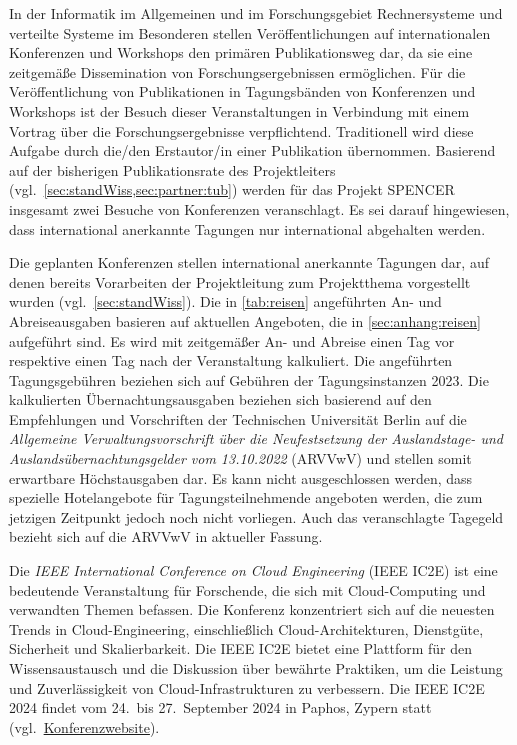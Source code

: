 In der Informatik im Allgemeinen und im Forschungsgebiet Rechnersysteme und verteilte Systeme im Besonderen stellen Veröffentlichungen auf internationalen Konferenzen und Workshops den primären Publikationsweg dar, da sie eine zeitgemäße Dissemination von Forschungsergebnissen ermöglichen.
Für die Veröffentlichung von Publikationen in Tagungsbänden von Konferenzen und Workshops ist der Besuch dieser Veranstaltungen in Verbindung mit einem Vortrag über die Forschungsergebnisse verpflichtend.
Traditionell wird diese Aufgabe durch die/den Erstautor/in einer Publikation übernommen.
Basierend auf der bisherigen Publikationsrate des Projektleiters (vgl.~\cref{sec:standWiss,sec:partner:tub}) werden für das Projekt SPENCER insgesamt zwei Besuche von Konferenzen veranschlagt.
Es sei darauf hingewiesen, dass international anerkannte Tagungen nur international abgehalten werden.

Die geplanten Konferenzen stellen international anerkannte Tagungen dar, auf denen bereits Vorarbeiten der Projektleitung zum Projektthema vorgestellt wurden (vgl.~\cref{sec:standWiss}).
Die in \cref{tab:reisen} angeführten An- und Abreiseausgaben basieren auf aktuellen Angeboten, die in \cref{sec:anhang:reisen} aufgeführt sind.
Es wird mit zeitgemäßer An- und Abreise einen Tag vor respektive einen Tag nach der Veranstaltung kalkuliert.
Die angeführten Tagungsgebühren beziehen sich auf Gebühren der Tagungsinstanzen 2023.
Die kalkulierten Übernachtungsausgaben beziehen sich basierend auf den Empfehlungen und Vorschriften der Technischen Universität Berlin auf die \emph{Allgemeine Verwaltungsvorschrift über die Neufestsetzung der Auslandstage- und Auslandsübernachtungsgelder vom 13.10.2022} (ARVVwV) und stellen somit erwartbare Höchstausgaben dar.
Es kann nicht ausgeschlossen werden, dass spezielle Hotelangebote für Tagungsteilnehmende angeboten werden, die zum jetzigen Zeitpunkt jedoch noch nicht vorliegen.
Auch das veranschlagte Tagegeld bezieht sich auf die ARVVwV in aktueller Fassung.

Die \emph{IEEE International Conference on Cloud Engineering} (IEEE IC2E) ist eine bedeutende Veranstaltung für Forschende, die sich mit Cloud-Computing und verwandten Themen befassen.
Die Konferenz konzentriert sich auf die neuesten Trends in Cloud-Engineering, einschließlich Cloud-Architekturen, Dienstgüte, Sicherheit und Skalierbarkeit.
Die IEEE IC2E bietet eine Plattform für den Wissensaustausch und die Diskussion über bewährte Praktiken, um die Leistung und Zuverlässigkeit von Cloud-Infrastrukturen zu verbessern.
Die IEEE IC2E 2024 findet vom 24.~bis 27.~September 2024 in Paphos, Zypern statt (vgl.~\href{https://conferences.computer.org/IC2E/2024/}{Konferenzwebsite}).


